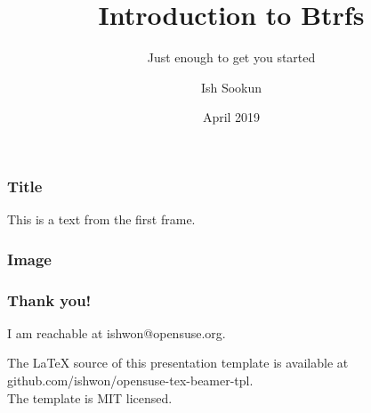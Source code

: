 \documentclass[aspectratio=169]{beamer}
\title{Introduction to Btrfs}
\subtitle{Just enough to get you started}
\author{Ish Sookun}
\date{April 2019}
\begin{document}
 
\frame{\titlepage}
 
\begin{frame}
\frametitle{Title}
This is a text from the first frame.
\end{frame}

\begin{frame}
\frametitle{Image}

\end{frame}

\begin{frame}
    \frametitle{Thank you!}
    I am reachable at ishwon@opensuse.org.\vspace{1em}

    \tiny The \LaTeX\hspace{0.01em} source of this presentation template is available at github.com/ishwon/opensuse-tex-beamer-tpl.\\
    The template is MIT licensed.
    \end{frame}
 
\end{document}
